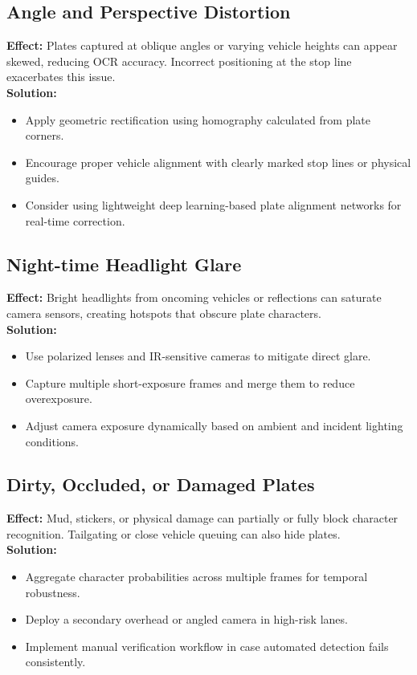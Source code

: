 	\subsection{Angle and Perspective Distortion}
	\textbf{Effect:} Plates captured at oblique angles or varying vehicle heights can appear skewed, reducing OCR accuracy. Incorrect positioning at the stop line exacerbates this issue. \\
	\textbf{Solution:} 
	\begin{itemize}
		\item Apply geometric rectification using homography calculated from plate corners.
		\item Encourage proper vehicle alignment with clearly marked stop lines or physical guides.
		\item Consider using lightweight deep learning-based plate alignment networks for real-time correction.
	\end{itemize}
	
	\subsection{Night-time Headlight Glare}
	\textbf{Effect:} Bright headlights from oncoming vehicles or reflections can saturate camera sensors, creating hotspots that obscure plate characters. \\
	\textbf{Solution:} 
	\begin{itemize}
		\item Use polarized lenses and IR-sensitive cameras to mitigate direct glare.
		\item Capture multiple short-exposure frames and merge them to reduce overexposure.
		\item Adjust camera exposure dynamically based on ambient and incident lighting conditions.
	\end{itemize}
	
	\subsection{Dirty, Occluded, or Damaged Plates}
	\textbf{Effect:} Mud, stickers, or physical damage can partially or fully block character recognition. Tailgating or close vehicle queuing can also hide plates. \\
	\textbf{Solution:} 
	\begin{itemize}
		\item Aggregate character probabilities across multiple frames for temporal robustness.
		\item Deploy a secondary overhead or angled camera in high-risk lanes.
		\item Implement manual verification workflow in case automated detection fails consistently.
	\end{itemize}
	
